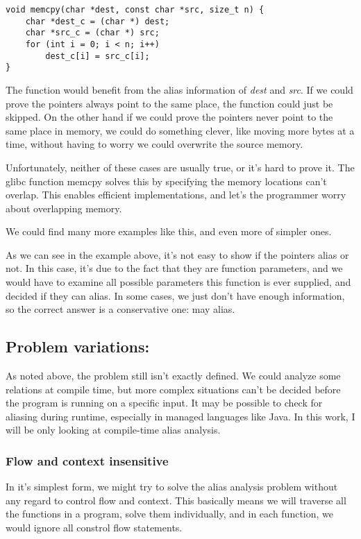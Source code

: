 \begin{verbatim}
void memcpy(char *dest, const char *src, size_t n) {
    char *dest_c = (char *) dest;
    char *src_c = (char *) src;
    for (int i = 0; i < n; i++)
        dest_c[i] = src_c[i];
}
\end{verbatim}

The function would benefit from the alias information of {\it dest} and {\it
src}. If we could prove the pointers always point to the same place, the
function could just be skipped. On the other hand if we could prove the pointers
never point to the same place in memory, we could do something clever, like
moving more bytes at a time, without having to worry we could overwrite the
source memory.

Unfortunately, neither of these cases are usually true, or it's hard to prove
it. The glibc function memcpy solves this by specifying the memory locations
can't overlap. This enables efficient implementations, and let's the programmer
worry about overlapping memory.

We could find many more examples like this, and even more of simpler ones.

As we can see in the example above, it's not easy to show if the pointers alias
or not. In this case, it's due to the fact that they are function parameters,
and we would have to examine all possible parameters this function is ever
supplied, and decided if they can alias. In some cases, we just don't have
enough information, so the correct answer is a conservative one: may alias.

\subsection{Problem variations: }

As noted above, the problem still isn't exactly defined. We could analyze some
relations at compile time, but more complex situations can't be decided before
the program is running on a specific input. It may be possible to check for
aliasing during runtime, especially in managed languages like Java. In this
work, I will be only looking at compile-time alias analysis.

\subsubsection{Flow and context insensitive}

In it's simplest form, we might try to solve the alias analysis problem without
any regard to control flow and context. This basically means we will traverse
all the functions in a program, solve them individually, and in each function,
we would ignore all constrol flow statements.

